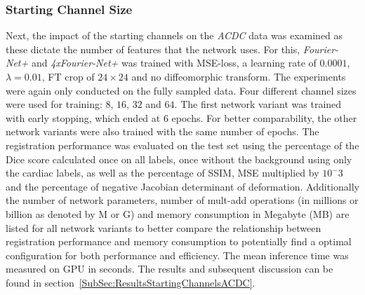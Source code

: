 \subsubsection{Starting Channel Size} \label{SubSubSec:StartingChannelsACDC}
Next, the impact of the starting channels on the \emph{ACDC} data was examined as these dictate the number of features that the network uses. For this, \emph{Fourier-Net+} and \emph{4xFourier-Net+} was trained with MSE-loss, a learning rate of $0.0001$, $\lambda = 0.01$, FT crop of $24 \times 24$ and no diffeomorphic transform. The experiments were again only conducted on the fully sampled data. Four different channel sizes were used for training: $8$, $16$, $32$ and $64$. The first network variant was trained with early stopping, which ended at 6 epochs. For better comparability, the other network variants were also trained with the same number of epochs. The registration performance was evaluated on the test set using the percentage of the Dice score calculated once on all labels, once without the background using only the cardiac labels, as well as the percentage of SSIM, MSE multiplied by $10^-3$ and the percentage of negative Jacobian determinant of deformation. Additionally the number of network parameters, number of mult-add operations (in millions or billion as denoted by M or G) and memory consumption in Megabyte (MB) are listed for all network variants to better compare the relationship between registration performance and memory consumption to potentially find a optimal configuration for both performance and efficiency. The mean inference time was measured on GPU in seconds. The results and subsequent discussion can be found in section~\ref{SubSec:ResultsStartingChannelsACDC}.


